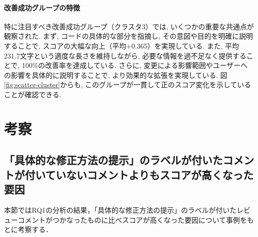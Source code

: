 \documentclass[11pt]{jreport}
\begin{document}
\subsubsection{改善成功グループの特徴}
特に注目すべき改善成功グループ（クラスタ3）では, いくつかの重要な共通点が観察された. まず, コードの具体的な部分を指摘し, その意図や目的を明確に説明することで, スコアの大幅な向上（平均+0.365）を実現している. また, 平均231.7文字という適度な長さを維持しながら, 必要な情報を過不足なく提供することで, 100\%の改善率を達成している. さらに, 変更による影響範囲やユーザーへの影響を具体的に説明することで, より効果的な拡張を実現している. 図\ref{fig:scatter-cluster}からも, このグループが一貫して正のスコア変化を示していることが確認できる.



\chapter{考察}\label{chap:fig-tab-exp}

\section{「具体的な修正方法の提示」のラベルが付いたコメントが付いていないコメントよりもスコアが高くなった要因}
本節ではRQ1の分析の結果，「具体的な修正方法の提示」のラベルが付いたレビューコメントがつかなったものに比べスコアが高くなった要因について事例をもとに考察する．
\end{document}
